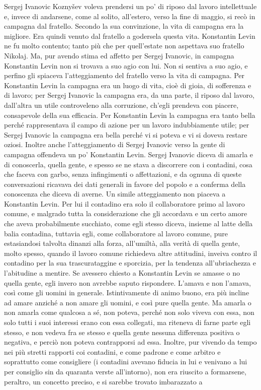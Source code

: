 \label{parte-terza} 
\pagestyle{pagina}

\label{i-2} 

Sergej Ivanovic Koznyšev voleva prendersi un po' di riposo dal lavoro intellettuale e, invece di andarsene, come al solito, all'estero, verso la fine di maggio, si recò in campagna dal fratello. Secondo la sua convinzione, la vita di campagna era la migliore. Era quindi venuto dal fratello a godersela questa vita. Konstantin Levin ne fu molto contento; tanto più che per quell'estate non aspettava suo fratello Nikolaj. Ma, pur avendo stima ed affetto per Sergej Ivanovic, in campagna Konstantin Levin non si trovava a suo agio con lui. Non si sentiva a suo agio, e perfino gli spiaceva l'atteggiamento del fratello verso la vita di campagna. Per Konstantin Levin la campagna era un luogo di vita, cioè di gioia, di sofferenza e di lavoro; per Sergej Ivanovic la campagna era, da una parte, il riposo dal lavoro, dall'altra un utile controveleno alla corruzione, ch'egli prendeva con piacere, consapevole della sua efficacia. Per Konstantin Levin la campagna era tanto bella perché rappresentava il campo di azione per un lavoro indubbiamente utile; per Sergej Ivanovic la campagna era bella perché vi si poteva e vi si doveva restare oziosi. Inoltre anche l'atteggiamento di Sergej Ivanovic verso la gente di campagna offendeva un po' Konstantin Levin. Sergej Ivanovic diceva di amarla e di conoscerla, quella gente, e spesso se ne stava a discorrere con i contadini, cosa che faceva con garbo, senza infingimenti o affettazioni, e da ognuna di queste conversazioni ricavava dei dati generali in favore del popolo e a conferma della conoscenza che diceva di averne. Un simile atteggiamento non piaceva a Konstantin Levin. Per lui il contadino era solo il collaboratore primo al lavoro comune, e malgrado tutta la considerazione che gli accordava e un certo amore che aveva probabilmente succhiato, come egli stesso diceva, insieme al latte della balia contadina, tuttavia egli, come collaboratore al lavoro comune, pure estasiandosi talvolta dinanzi alla forza, all'umiltà, alla verità di quella gente, molto spesso, quando il lavoro comune richiedeva altre attitudini, inveiva contro il contadino per la sua trascurataggine e sporcizia, per la tendenza all'ubriachezza e l'abitudine a mentire. Se avessero chiesto a Konstantin Levin se amasse o no quella gente, egli invero non avrebbe saputo rispondere. L'amava e non l'amava, così come gli uomini in generale. Istintivamente di animo buono, era più incline ad amare anziché a non amare gli uomini, e così pure quella gente. Ma amarla o non amarla come qualcosa a sé, non poteva, perché non solo viveva con essa, non solo tutti i suoi interessi erano con essa collegati, ma riteneva di farne parte egli stesso, e non vedeva fra se stesso e quella gente nessuna differenza positiva o negativa, e perciò non poteva contrapporsi ad essa. Inoltre, pur vivendo da tempo nei più stretti rapporti coi contadini, e come padrone e come arbitro e soprattutto come consigliere (i contadini avevano fiducia in lui e venivano a lui per consiglio sin da quaranta verste all'intorno), non era riuscito a formarsene, peraltro, un concetto preciso, e si sarebbe trovato imbarazzato a 